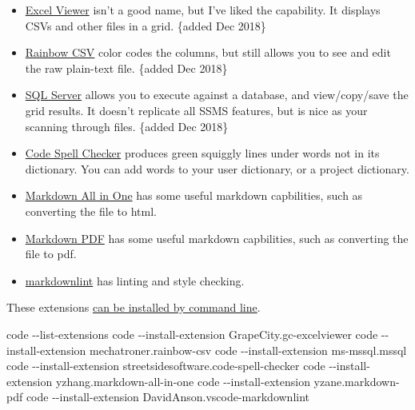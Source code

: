 \documentclass[
]{book}
\newenvironment{Shaded}{\begin{snugshade}}{\end{snugshade}}
\newcommand{\ExtensionTok}[1]{#1}
\newcommand{\NormalTok}[1]{#1}
\begin{document}
\begin{itemize}
  \begin{itemize}
  \item
    \href{https://marketplace.visualstudio.com/items?itemName=GrapeCity.gc-excelviewer}{Excel Viewer} isn't a good name, but I've liked the capability. It displays CSVs and other files in a grid. \{added Dec 2018\}
  \item
    \href{https://marketplace.visualstudio.com/items?itemName=mechatroner.rainbow-csv}{Rainbow CSV} color codes the columns, but still allows you to see and edit the raw plain-text file. \{added Dec 2018\}
  \item
    \href{https://marketplace.visualstudio.com/items?itemName=ms-mssql.mssql}{SQL Server} allows you to execute against a database, and view/copy/save the grid results. It doesn't replicate all SSMS features, but is nice as your scanning through files. \{added Dec 2018\}
  \item
    \href{https://marketplace.visualstudio.com/items?itemName=streetsidesoftware.code-spell-checker}{Code Spell Checker} produces green squiggly lines under words not in its dictionary. You can add words to your user dictionary, or a project dictionary.
  \item
    \href{https://marketplace.visualstudio.com/items?itemName=yzhang.markdown-all-in-one}{Markdown All in One} has some useful markdown capbilities, such as converting the file to html.
  \item
    \href{https://marketplace.visualstudio.com/items?itemName=yzane.markdown-pdf}{Markdown PDF} has some useful markdown capbilities, such as converting the file to pdf.
  \item
    \href{https://marketplace.visualstudio.com/items?itemName=DavidAnson.vscode-markdownlint}{markdownlint} has linting and style checking.
  \end{itemize}

  These extensions \href{https://code.visualstudio.com/docs/editor/command-line\#_working-with-extensions}{can be installed by command line}.

\begin{Shaded}
\begin{Highlighting}[]
\ExtensionTok{code}\NormalTok{ {-}{-}list{-}extensions}
\ExtensionTok{code}\NormalTok{ {-}{-}install{-}extension GrapeCity.gc{-}excelviewer}
\ExtensionTok{code}\NormalTok{ {-}{-}install{-}extension mechatroner.rainbow{-}csv}
\ExtensionTok{code}\NormalTok{ {-}{-}install{-}extension ms{-}mssql.mssql}
\ExtensionTok{code}\NormalTok{ {-}{-}install{-}extension streetsidesoftware.code{-}spell{-}checker}
\ExtensionTok{code}\NormalTok{ {-}{-}install{-}extension yzhang.markdown{-}all{-}in{-}one}
\ExtensionTok{code}\NormalTok{ {-}{-}install{-}extension yzane.markdown{-}pdf}
\ExtensionTok{code}\NormalTok{ {-}{-}install{-}extension DavidAnson.vscode{-}markdownlint}
\end{Highlighting}
\end{Shaded}


\end{itemize}
\end{document}
